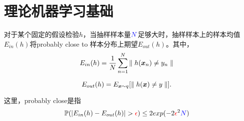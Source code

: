 \chapter{理论机器学习基础}

\begin{theorem}[PAC理论] \label{thm:pac} 
  对于某个固定的假设检验$h$，当抽样样本量$\textcolor{blue}{N}$足够大时，抽样样本上的样本均值$E_{in}(h)$将probably close to 样本分布上期望$E_{out}(h)$。其中，
  \begin{equation}
    E_{in}(h) = \frac{1}{N}\sum_{n=1}^{N}{\parallel h(\bm{x}_n) \neq y_n \parallel} \notag
  \end{equation}

  \begin{equation}
    E_{out}(h) = E_{\bm{x}\sim q}[\parallel h(\bm{x}) \neq y \parallel]. \notag
  \end{equation}

  这里，probably close是指
  \begin{equation}
    \mathbb{P}(|E_{in}(h) - E_{out}(h)| > \textcolor{red}{\epsilon}) \leq 2exp(-2\textcolor{red}{\epsilon}^2\textcolor{blue}{N})
  \end{equation}
\end{theorem}